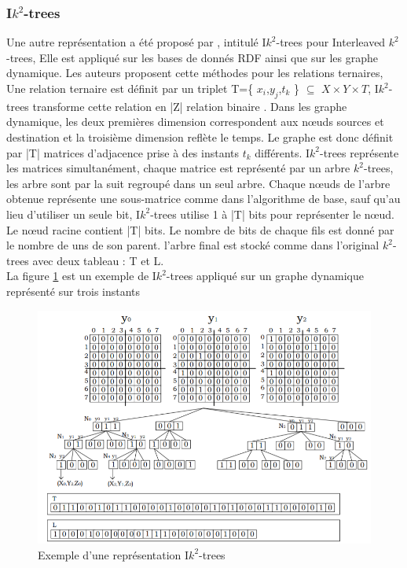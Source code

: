 \subsubsection{I$k^2$-trees}
Une autre représentation a été proposé par \citep{garcia2014interleaved}, intitulé I$k^2$-trees pour Interleaved $k^2$-trees, Elle est appliqué sur les bases de donnés RDF ainsi que sur les graphe dynamique. Les auteurs proposent cette méthodes pour les relations ternaires, Une relation ternaire est définit par un triplet T=\{ $x_i$,$y_j$,$t_k$ \} $\subseteq$ $ X \times Y \times T$, I$k^2$-trees transforme cette relation en |Z| relation binaire . Dans les graphe dynamique, les deux premières dimension correspondent aux nœuds sources et destination et la troisième dimension reflète le temps. Le graphe est donc définit par |T| matrices d'adjacence prise à des instants $t_k$ différents. I$k^2$-trees représente les matrices simultanément, chaque matrice est représenté par un arbre $k^2$-trees, les arbre sont par la suit regroupé dans un seul arbre. Chaque nœuds de l'arbre obtenue représente une sous-matrice comme dans l'algorithme de base, sauf qu'au lieu d'utiliser un seule bit, I$k^2$-trees utilise 1 à |T| bits pour représenter le nœud. Le nœud racine contient |T| bits. Le nombre de bits de chaque fils est donné par le nombre de uns de son parent. l'arbre final est stocké comme dans l'original $k^2$-trees avec deux tableau : T et L.\\
La figure \ref{Ik2-trees} est un exemple de I$k^2$-trees appliqué sur un graphe dynamique représenté sur trois instants

\begin{figure}[H]
\begin{center}
\includegraphics[height=200 pt, width=380 pt]{./ressources/image/Ik2-trees.png} 
\end{center}
\caption{Exemple d'une représentation I$k^2$-trees}
\label{Ik2-trees}
\end{figure}

